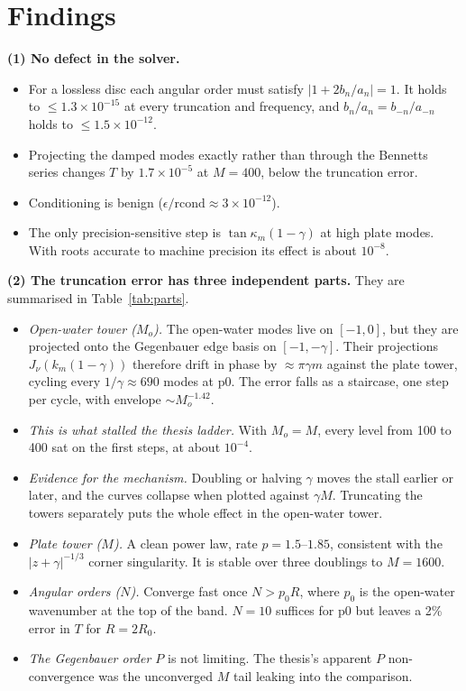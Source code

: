 \documentclass[10pt,a4paper]{article}
\begin{document}
\section{Findings}
\textbf{(1) No defect in the solver.}
\begin{itemize}
\item For a lossless disc each angular order must satisfy $|1+2b_n/a_n|=1$. It holds to $\le1.3\times10^{-15}$ at every truncation and frequency, and $b_n/a_n=b_{-n}/a_{-n}$ holds to $\le1.5\times10^{-12}$.
\item Projecting the damped modes exactly rather than through the Bennetts series changes $T$ by $1.7\times10^{-5}$ at $M=400$, below the truncation error.
\item Conditioning is benign ($\epsilon/\mathrm{rcond}\approx3\times10^{-12}$).
\item The only precision-sensitive step is $\tan\kappa_m(1-\gamma)$ at high plate modes. With roots accurate to machine precision its effect is about $10^{-8}$.
\end{itemize}

\textbf{(2) The truncation error has three independent parts.} They are summarised in Table~\ref{tab:parts}.
\begin{itemize}
\item \emph{Open-water tower ($M_o$).} The open-water modes live on $[-1,0]$, but they are projected onto the Gegenbauer edge basis on $[-1,-\gamma]$. Their projections $J_\nu(k_m(1-\gamma))$ therefore drift in phase by $\approx\pi\gamma m$ against the plate tower, cycling every $1/\gamma\approx690$ modes at p0. The error falls as a staircase, one step per cycle, with envelope $\sim M_o^{-1.42}$.
\item \emph{This is what stalled the thesis ladder.} With $M_o=M$, every level from 100 to 400 sat on the first steps, at about $10^{-4}$.
\item \emph{Evidence for the mechanism.} Doubling or halving $\gamma$ moves the stall earlier or later, and the curves collapse when plotted against $\gamma M$. Truncating the towers separately puts the whole effect in the open-water tower.
\item \emph{Plate tower ($M$).} A clean power law, rate $p=1.5$--$1.85$, consistent with the $|z+\gamma|^{-1/3}$ corner singularity. It is stable over three doublings to $M=1600$.
\item \emph{Angular orders ($N$).} Converge fast once $N>p_0R$, where $p_0$ is the open-water wavenumber at the top of the band. $N=10$ suffices for p0 but leaves a 2\% error in $T$ for $R=2R_0$.
\item \emph{The Gegenbauer order $P$} is not limiting. The thesis's apparent $P$ non-convergence was the unconverged $M$ tail leaking into the comparison.
\end{itemize}
\end{document}
